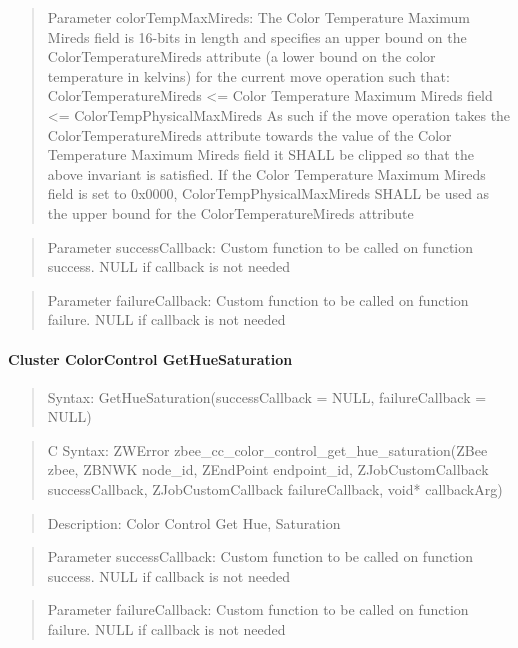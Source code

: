 \begin{quote}Parameter colorTempMaxMireds: The Color Temperature Maximum Mireds field is 16-bits in length and specifies an upper bound on the ColorTemperatureMireds attribute (a lower bound on the color temperature in kelvins) for the current move operation such that: ColorTemperatureMireds <= Color Temperature Maximum Mireds field <= ColorTempPhysicalMaxMireds As such if the move operation takes the ColorTemperatureMireds attribute towards the value of the Color Temperature Maximum Mireds field it SHALL be clipped so that the above invariant is satisfied. If the Color Temperature Maximum Mireds field is set to 0x0000, ColorTempPhysicalMaxMireds SHALL be used as the upper bound for the ColorTemperatureMireds attribute\end{quote}
\begin{quote}Parameter successCallback: Custom function to be called on function success. NULL if callback is not needed\end{quote}
\begin{quote}Parameter failureCallback: Custom function to be called on function failure. NULL if callback is not needed\end{quote}


\paragraph{Cluster ColorControl GetHueSaturation}
\begin{quote}Syntax: GetHueSaturation(successCallback = NULL, failureCallback = NULL)\end{quote}
\begin{quote}C Syntax: ZWError zbee\_cc\_color\_control\_get\_hue\_saturation(ZBee zbee, ZBNWK node\_id, ZEndPoint endpoint\_id, ZJobCustomCallback successCallback, ZJobCustomCallback failureCallback, void* callbackArg)\end{quote}
\begin{quote}Description: Color Control Get Hue, Saturation\end{quote}
\begin{quote}Parameter successCallback: Custom function to be called on function success. NULL if callback is not needed\end{quote}
\begin{quote}Parameter failureCallback: Custom function to be called on function failure. NULL if callback is not needed\end{quote}


